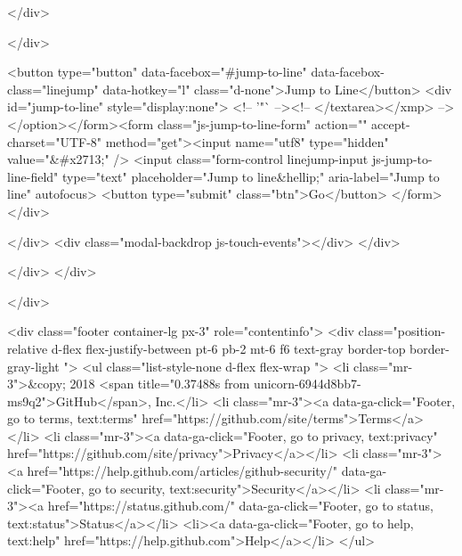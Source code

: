   </div>

  </div>

  <button type="button" data-facebox="#jump-to-line" data-facebox-class="linejump" data-hotkey="l" class="d-none">Jump to Line</button>
  <div id="jump-to-line" style="display:none">
    <!-- '"` --><!-- </textarea></xmp> --></option></form><form class="js-jump-to-line-form" action="" accept-charset="UTF-8" method="get"><input name="utf8" type="hidden" value="&#x2713;" />
      <input class="form-control linejump-input js-jump-to-line-field" type="text" placeholder="Jump to line&hellip;" aria-label="Jump to line" autofocus>
      <button type="submit" class="btn">Go</button>
</form>  </div>


  </div>
  <div class="modal-backdrop js-touch-events"></div>
</div>

    </div>
  </div>

  </div>

      
<div class="footer container-lg px-3" role="contentinfo">
  <div class="position-relative d-flex flex-justify-between pt-6 pb-2 mt-6 f6 text-gray border-top border-gray-light ">
    <ul class="list-style-none d-flex flex-wrap ">
      <li class="mr-3">&copy; 2018 <span title="0.37488s from unicorn-6944d8bb7-ms9q2">GitHub</span>, Inc.</li>
        <li class="mr-3"><a data-ga-click="Footer, go to terms, text:terms" href="https://github.com/site/terms">Terms</a></li>
        <li class="mr-3"><a data-ga-click="Footer, go to privacy, text:privacy" href="https://github.com/site/privacy">Privacy</a></li>
        <li class="mr-3"><a href="https://help.github.com/articles/github-security/" data-ga-click="Footer, go to security, text:security">Security</a></li>
        <li class="mr-3"><a href="https://status.github.com/" data-ga-click="Footer, go to status, text:status">Status</a></li>
        <li><a data-ga-click="Footer, go to help, text:help" href="https://help.github.com">Help</a></li>
    </ul>

